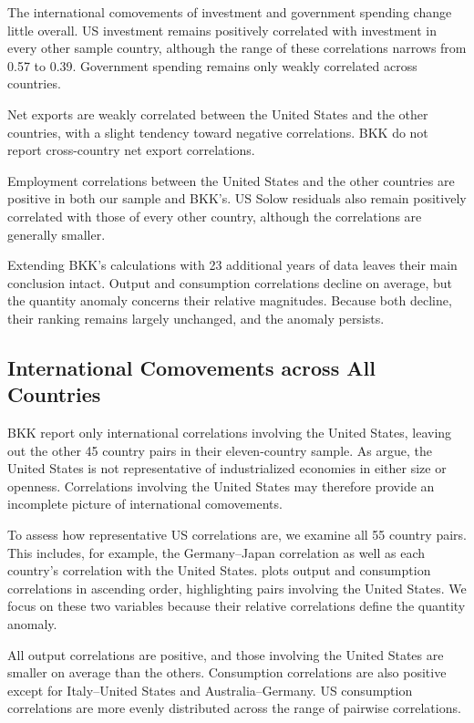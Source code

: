 The international comovements of investment and government spending change little overall. US investment remains positively correlated with investment in every other sample country, although the range of these correlations narrows from 0.57 to 0.39. Government spending remains only weakly correlated across countries.

Net exports are weakly correlated between the United States and the other countries, with a slight tendency toward negative correlations. BKK do not report cross-country net export correlations.

Employment correlations between the United States and the other countries are positive in both our sample and BKK's. US Solow residuals also remain positively correlated with those of every other country, although the correlations are generally smaller.

Extending BKK's calculations with 23 additional years of data leaves their main conclusion intact. Output and consumption correlations decline on average, but the quantity anomaly concerns their relative magnitudes. Because both decline, their ranking remains largely unchanged, and the anomaly persists.




\subsection{International Comovements across All Countries}

BKK report only international correlations involving the United States, leaving out the other 45 country pairs in their eleven-country sample. As \cite{Ambler:2004aa} argue, the United States is not representative of industrialized economies in either size or openness. Correlations involving the United States may therefore provide an incomplete picture of international comovements.

To assess how representative US correlations are, we examine all 55 country pairs. This includes, for example, the Germany--Japan correlation as well as each country's correlation with the United States.  plots output and consumption correlations in ascending order, highlighting pairs involving the United States. We focus on these two variables because their relative correlations define the quantity anomaly.

All output correlations are positive, and those involving the United States are smaller on average than the others. Consumption correlations are also positive except for Italy--United States and Australia--Germany. US consumption correlations are more evenly distributed across the range of pairwise correlations.

